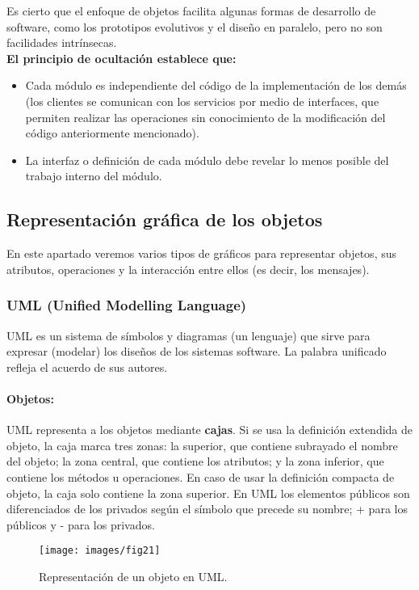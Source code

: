 Es cierto que el enfoque de objetos facilita algunas formas de
desarrollo de software, como los prototipos evolutivos y el diseño en
paralelo, pero no son facilidades intrínsecas.\\
\textbf{El principio de ocultación establece que:}
\begin{itemize}
\item Cada módulo es independiente del código de la implementación
  de los demás (los clientes se comunican con los servicios por
  medio de interfaces, que permiten realizar las operaciones sin
  conocimiento de la modificación del código anteriormente
  mencionado).
\item La interfaz o definición de cada módulo debe revelar lo menos
  posible del trabajo interno del módulo.
\end{itemize}

\subsection{Representación gráfica de los objetos}
En este apartado veremos varios tipos de gráficos para representar
objetos, sus atributos, operaciones y la interacción entre ellos (es
decir, los mensajes).
\subsubsection{UML (Unified Modelling Language)}
UML es un sistema de símbolos y diagramas (un lenguaje) que sirve para
expresar (modelar) los diseños de los sistemas software. La palabra
unificado refleja el acuerdo de sus autores.

\paragraph{Objetos:}
UML representa a los objetos mediante \textbf{cajas}. Si se usa la
definición extendida de objeto, la caja marca tres zonas: la superior,
que contiene subrayado el nombre del objeto; la zona central, que contiene
los atributos; y la zona inferior, que contiene los métodos u operaciones. En caso de usar
la definición compacta de objeto, la caja solo contiene la zona
superior. En UML los elementos públicos son diferenciados de los
privados según el símbolo que precede su nombre; \textrm{+} para los públicos
y \textrm{-} para los privados.

\begin{figure}[ht!]  \centering
  \texttt{[image: images/fig21]}
  \caption{Representación de un objeto en UML.}
  \label{fig:21}
\end{figure}

